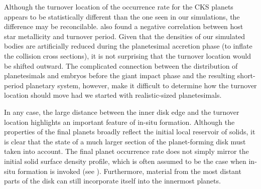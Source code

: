 Although the turnover location of the occurrence rate for the CKS planets appears to be statistically different than the one seen in our simulations, the difference may be reconcilable. \cite{petigura18} also found a negative correlation between host star metallicity and turnover period. Given that the densities of our simulated bodies are artificially reduced during the planetesimal accretion phase (to inflate the collision cross sections), it is not surprising that the turnover location would be shifted outward. The complicated connection between the distribution of planetesimals and embryos before the giant impact phase and the resulting short-period planetary system, however, make it difficult to determine how the turnover location should move had we started with realistic-sized planetesimals.

In any case, the large distance between the inner disk edge and the turnover location highlights an important feature of in-situ formation. Although the properties of the final planets broadly reflect the initial local reservoir of solids, it is clear that the state of a much larger section of the planet-forming disk must taken into account. The final planet occurrence rate does not simply mirror the initial solid surface density profile, which is often assumed to be the case when in-situ formation is invoked (see \cite{chiang13, dai20}). Furthermore, material from the most distant parts of the disk can still incorporate itself into the innermost planets. 